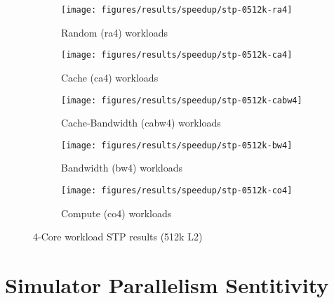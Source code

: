 \begin{figure}
    \centering
    \begin{subfigure}[b]{\textwidth}
            \texttt{[image: figures/results/speedup/stp-0512k-ra4]}
            \caption{Random (ra4) workloads}
            \label{fig:results:4core:stp:random}
    \end{subfigure}

    \begin{subfigure}[b]{0.5\textwidth}
            \texttt{[image: figures/results/speedup/stp-0512k-ca4]}
            \caption{Cache (ca4) workloads}
            \label{fig:results:4core:stp:cache}
    \end{subfigure}%
    \begin{subfigure}[b]{0.5\textwidth}
            \texttt{[image: figures/results/speedup/stp-0512k-cabw4]}
            \caption{Cache-Bandwidth (cabw4) workloads}
            \label{fig:results:4core:stp:cache-bw}
    \end{subfigure}

    \begin{subfigure}[b]{0.5\textwidth}
            \texttt{[image: figures/results/speedup/stp-0512k-bw4]}
            \caption{Bandwidth (bw4) workloads}
            \label{fig:results:4core:stp:bw}
    \end{subfigure}%
    \begin{subfigure}[b]{0.5\textwidth}
            \texttt{[image: figures/results/speedup/stp-0512k-co4]}
            \caption{Compute (co4) workloads}
            \label{fig:results:4core:stp:co}
    \end{subfigure}%

    \caption{4-Core workload STP results (512k L2)}\label{fig:results:4core:stp}
\end{figure}

\section{Simulator Parallelism Sentitivity}
